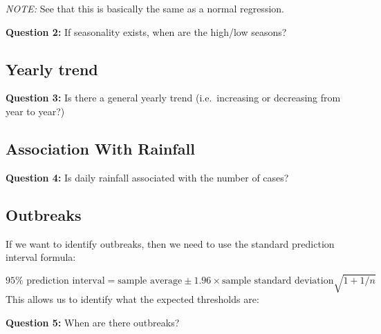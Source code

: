 \documentclass[]{book}
\newenvironment{Shaded}{\begin{snugshade}}{\end{snugshade}}
\newcommand{\KeywordTok}[1]{\textcolor[rgb]{0.13,0.29,0.53}{\textbf{#1}}}
\newcommand{\DataTypeTok}[1]{\textcolor[rgb]{0.13,0.29,0.53}{#1}}
\newcommand{\DecValTok}[1]{\textcolor[rgb]{0.00,0.00,0.81}{#1}}
\newcommand{\StringTok}[1]{\textcolor[rgb]{0.31,0.60,0.02}{#1}}
\newcommand{\OperatorTok}[1]{\textcolor[rgb]{0.81,0.36,0.00}{\textbf{#1}}}
\newcommand{\ErrorTok}[1]{\textcolor[rgb]{0.64,0.00,0.00}{\textbf{#1}}}
\newcommand{\NormalTok}[1]{#1}
\begin{document}
\emph{NOTE:} See that this is basically the same as a normal regression.

\textbf{Question 2:} If seasonality exists, when are the high/low
seasons?

\subsection{Yearly trend}\label{yearly-trend}

\textbf{Question 3:} Is there a general yearly trend (i.e.~increasing or
decreasing from year to year?)

\subsection{Association With Rainfall}\label{association-with-rainfall}

\textbf{Question 4:} Is daily rainfall associated with the number of
cases?

\subsection{Outbreaks}\label{outbreaks}

If we want to identify outbreaks, then we need to use the standard
prediction interval formula:

\[
95\% \text{ prediction interval} = \text{sample average} \pm 1.96 \times \text{sample standard deviation} \sqrt{ 1 + 1 / n}
\] This allows us to identify what the expected thresholds are:

\begin{Shaded}
\end{Shaded}

\textbf{Question 5:} When are there outbreaks?
\end{document}
